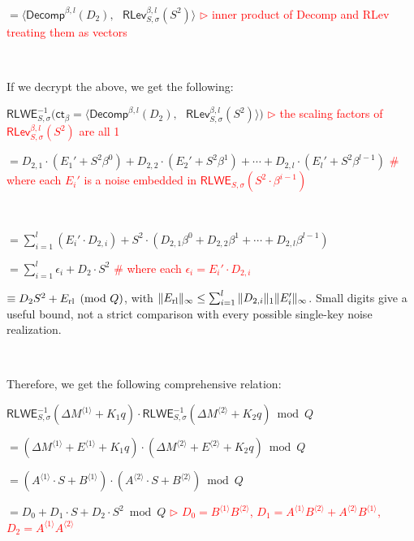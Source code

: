 $ $

$= \bm{\langle} \textsf{Decomp}^{\beta, l}(D_2), \text{ } \textsf{RLev}_{S, \sigma}^{\beta, l}( S^2) \bm{\rangle}$ \textcolor{red}{  $\rhd$ inner product of \textsf{Decomp} and \textsf{RLev} treating them as vectors}

$ $

If we decrypt the above, we get the following:

$\textsf{RLWE}_{S, \sigma}^{-1}(\textsf{ct}_\beta = \bm{\langle} \textsf{Decomp}^{\beta, l}(D_2), \text{ } \textsf{RLev}_{S, \sigma}^{\beta, l}( S^2) \bm{\rangle} \bm{)}$ \textcolor{red}{ $\rhd$ the scaling factors of $\textsf{RLev}_{S, \sigma}^{\beta, l}( S^2)$ are all 1}

$= D_{2,1}\cdot\left(E_1' +  S^2\beta^{0}\right) + D_{2,2}\cdot\left(E_2' +  S^2\beta^{1}\right) + \cdots + D_{2,l}\cdot\left(E_l' +  S^2\beta^{l-1}\right)$ \textcolor{red}{ \text{ } \# where each $E_i'$ is a noise embedded in $\textsf{RLWE}_{S, \sigma}\left(S^2\cdot\beta^{i-1}\right)$}

$ $

$= \sum\limits_{i=1}^{l} (E_i'\cdot D_{2,i}) +  S^2\cdot\left(D_{2,1}\beta^{0} + D_{2,2}\beta^{1} + \cdots + D_{2, l}\beta^{l-1}\right)$

$= \sum\limits_{i=1}^{l} \epsilon_{i} + D_2\cdot S^2$ \textcolor{red}{ \text{ } \# where each $\epsilon_i = E_i'\cdot D_{2,i}$}

$\equiv D_2S^2+E_{\rm rl}\pmod Q$, with $\|E_{\rm rl}\|_\infty\leq\sum_{i=1}^l\|D_{2,i}\|_1\|E_i'\|_\infty$. Small digits give a useful bound, not a strict comparison with every possible single-key noise realization.

$ $

Therefore, we get the following comprehensive relation:


$\textsf{RLWE}_{S, \sigma}^{-1}(\Delta M^{\langle 1 \rangle} + K_1q) \cdot \textsf{RLWE}_{S, \sigma}^{-1}(\Delta M^{\langle 2 \rangle} + K_2q) \bmod Q$

$= (\Delta M^{\langle 1 \rangle} + E^{\langle 1 \rangle} + K_1q) \cdot (\Delta M^{\langle 2 \rangle} + E^{\langle 2 \rangle} + K_2q) \bmod Q$

$ = (A^{\langle 1 \rangle} \cdot S + B^{\langle 1 \rangle}) \cdot (A^{\langle 2 \rangle} \cdot S + B^{\langle 2 \rangle})  \bmod Q$

$ = D_0 + D_1\cdot S + D_2\cdot S^2  \bmod Q$ \textcolor{red}{ $\rhd$ $D_0 = B^{\langle 1 \rangle} B^{\langle 2 \rangle}$, \text{ } $D_1 = A^{\langle 1 \rangle} B^{\langle 2 \rangle} + A^{\langle 2 \rangle} B^{\langle 1 \rangle}$, \text{ } $D_2 = A^{\langle 1 \rangle} A^{\langle 2 \rangle}$}

